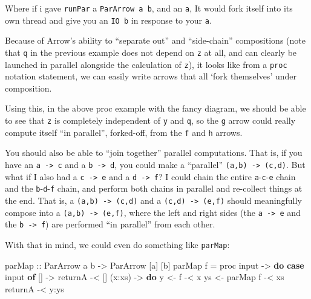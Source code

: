 \documentclass[]{article}
\newenvironment{Shaded}{}{}
\newcommand{\DataTypeTok}[1]{\textcolor[rgb]{0.56,0.13,0.00}{#1}}
\newcommand{\KeywordTok}[1]{\textcolor[rgb]{0.00,0.44,0.13}{\textbf{#1}}}
\newcommand{\NormalTok}[1]{#1}
\newcommand{\OperatorTok}[1]{\textcolor[rgb]{0.40,0.40,0.40}{#1}}
\newcommand{\OtherTok}[1]{\textcolor[rgb]{0.00,0.44,0.13}{#1}}
\begin{document}
Where if i gave \texttt{runPar} a \texttt{ParArrow\ a\ b}, and an \texttt{a}, It
would fork itself into its own thread and give you an \texttt{IO\ b} in response
to your \texttt{a}.

Because of Arrow's ability to ``separate out'' and ``side-chain'' compositions
(note that \texttt{q} in the previous example does not depend on \texttt{z} at
all, and can clearly be launched in parallel alongside the calculation of
\texttt{z}), it looks like from a \texttt{proc} notation statement, we can
easily write arrows that all `fork themselves' under composition.

Using this, in the above proc example with the fancy diagram, we should be able
to see that \texttt{z} is completely independent of \texttt{y} and \texttt{q},
so the \texttt{g} arrow could really compute itself ``in parallel'', forked-off,
from the \texttt{f} and \texttt{h} arrows.

You should also be able to ``join together'' parallel computations. That is, if
you have an \texttt{a\ -\textgreater{}\ c} and a \texttt{b\ -\textgreater{}\ d},
you could make a ``parallel'' \texttt{(a,b)\ -\textgreater{}\ (c,d)}. But what
if I also had a \texttt{c\ -\textgreater{}\ e} and a
\texttt{d\ -\textgreater{}\ f}? I could chain the entire
\texttt{a}-\texttt{c}-\texttt{e} chain and the \texttt{b}-\texttt{d}-\texttt{f}
chain, and perform both chains in parallel and re-collect things at the end.
That is, a \texttt{(a,b)\ -\textgreater{}\ (c,d)} and a
\texttt{(c,d)\ -\textgreater{}\ (e,f)} should meaningfully compose into a
\texttt{(a,b)\ -\textgreater{}\ (e,f)}, where the left and right sides (the
\texttt{a\ -\textgreater{}\ e} and the \texttt{b\ -\textgreater{}\ f}) are
performed ``in parallel'' from each other.

With that in mind, we could even do something like \texttt{parMap}:

\begin{Shaded}
\begin{Highlighting}[]
\OtherTok{parMap ::} \DataTypeTok{ParArrow}\NormalTok{ a b }\OtherTok{{-}>} \DataTypeTok{ParArrow}\NormalTok{ [a] [b]}
\NormalTok{parMap f }\OtherTok{=}\NormalTok{ proc input }\OtherTok{{-}>} \KeywordTok{do}
    \KeywordTok{case}\NormalTok{ input }\KeywordTok{of}
\NormalTok{      []     }\OtherTok{{-}>}
\NormalTok{          returnA        }\OperatorTok{{-}<}\NormalTok{ []}
\NormalTok{      (x}\OperatorTok{:}\NormalTok{xs) }\OtherTok{{-}>} \KeywordTok{do}
\NormalTok{          y  }\OtherTok{<{-}}\NormalTok{ f        }\OperatorTok{{-}<}\NormalTok{ x}
\NormalTok{          ys }\OtherTok{<{-}}\NormalTok{ parMap f }\OperatorTok{{-}<}\NormalTok{ xs}
\NormalTok{          returnA        }\OperatorTok{{-}<}\NormalTok{ y}\OperatorTok{:}\NormalTok{ys}
\end{Highlighting}
\end{Shaded}
\end{document}
